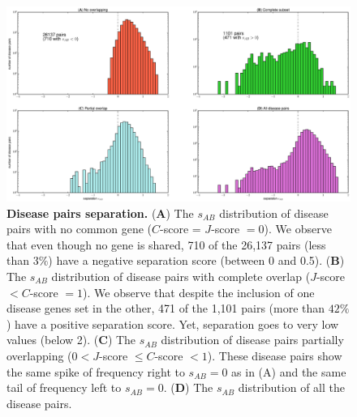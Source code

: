 \documentclass[letterpaper]{article}
\begin{document}
		\begin{figure}[!t]
			\hspace{-2.2cm}
			\vspace{-1cm}
			\includegraphics[scale=.36]{images/s_AB_histograms.eps}
			\caption{\label{fig:s_AB histogram}
			{\bf Disease pairs separation.}
			({\bf A}) The $s_{AB}$ distribution of disease pairs with no common gene ($C$-score = $J$-score $= 0$). We
			observe that even though no gene is shared, 710 of the 26,137 pairs (less than $3\%$) have a negative
			separation score (between 0 and 0.5).
			({\bf B}) The $s_{AB}$ distribution of disease pairs with complete overlap ($J$-score $< C$-score $= 1$).
			We observe that despite the inclusion of one disease genes set in the other, 471 of the 1,101 pairs
			(more than $42\%$) have a positive separation score. Yet, separation goes to very low values (below 2).
			({\bf C}) The $s_{AB}$ distribution of disease pairs partially overlapping ($0 < J$-score $ \leq C$-score $< 1$).
			These disease pairs show the same spike of frequency right to $s_{AB} = 0$ as in (A) and the same tail of frequency
			left to $s_{AB} = 0$.
			({\bf D}) The $s_{AB}$ distribution of all the disease pairs.
			}
			\vspace{-.5cm}
		\end{figure}
\end{document}
